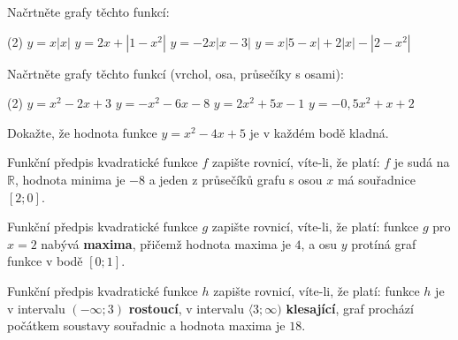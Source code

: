 \documentclass[12pt,a4paper]{article}
\begin{document}
\begin{exercise}
Načrtněte grafy těchto funkcí:
\begin{tasks}(2)
  \task $y = x|x|$
  \task $y = 2x + |1 - x^2|$
  \task $y = -2x|x - 3|$
  \task $y = x|5 - x| + 2|x| - |2 - x^2|$
\end{tasks}
\end{exercise}


\begin{exercise}
Načrtněte grafy těchto funkcí (vrchol, osa, průsečíky s osami):
\begin{tasks}(2)
  \task \(y=x^2-2x+3\)
  \task \(y=-x^2-6x-8\)
  \task \(y=2x^2+5x-1\)
  \task \(y=-0{,}5x^2+x+2\)
\end{tasks}
\end{exercise}

\begin{exercise}
Dokažte, že hodnota funkce \(y=x^2-4x+5\) je v každém bodě kladná.
\end{exercise}

\begin{exercise}
Funkční předpis kvadratické funkce \(f\) zapište rovnicí, víte-li, že platí:  
\(f\) je sudá na \(\mathbb{R}\), hodnota minima je \(-8\) a jeden z průsečíků grafu s osou \(x\) má souřadnice \([2;0]\).
\end{exercise}

\begin{exercise}
Funkční předpis kvadratické funkce \(g\) zapište rovnicí, víte-li, že platí:  
funkce \(g\) pro \(x=2\) nabývá \textbf{maxima}, přičemž hodnota maxima je \(4\), a osu \(y\) protíná graf funkce v bodě \([0;1]\).
\end{exercise}

\begin{exercise}
Funkční předpis kvadratické funkce \(h\) zapište rovnicí, víte-li, že platí:  
funkce \(h\) je v intervalu \((-\infty;3)\) \textbf{rostoucí}, v intervalu \(\langle 3;\infty)\) \textbf{klesající}, graf prochází počátkem soustavy souřadnic a hodnota maxima je \(18\).
\end{exercise}
\end{document}
